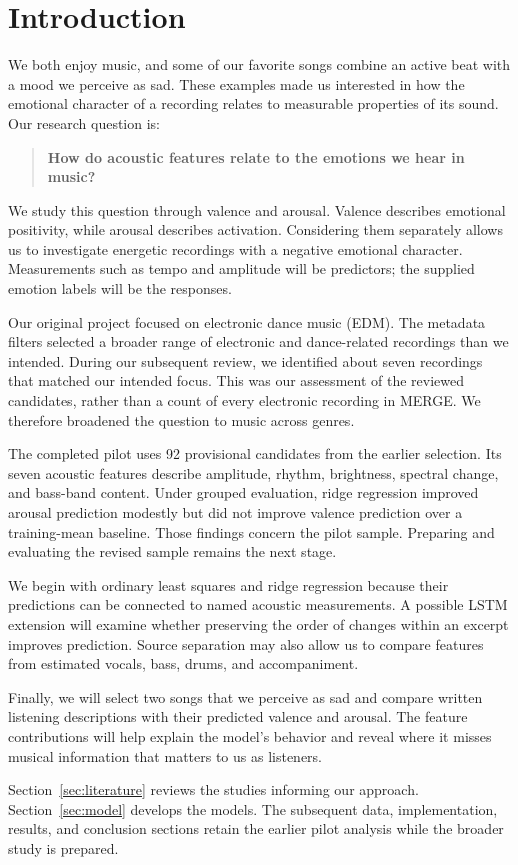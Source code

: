 \section{Introduction}
\label{sec:introduction}

We both enjoy music, and some of our favorite songs combine an active beat with a mood we perceive as sad. These examples made us interested in how the emotional character of a recording relates to measurable properties of its sound. Our research question is:
\begin{quote}
\textbf{How do acoustic features relate to the emotions we hear in music?}
\end{quote}

We study this question through valence and arousal. Valence describes emotional positivity, while arousal describes activation. Considering them separately allows us to investigate energetic recordings with a negative emotional character. Measurements such as tempo and amplitude will be predictors; the supplied emotion labels will be the responses.

Our original project focused on electronic dance music (EDM). The metadata filters selected a broader range of electronic and dance-related recordings than we intended. During our subsequent review, we identified about seven recordings that matched our intended focus. This was our assessment of the reviewed candidates, rather than a count of every electronic recording in MERGE. We therefore broadened the question to music across genres.

The completed pilot uses 92 provisional candidates from the earlier selection. Its seven acoustic features describe amplitude, rhythm, brightness, spectral change, and bass-band content. Under grouped evaluation, ridge regression improved arousal prediction modestly but did not improve valence prediction over a training-mean baseline. Those findings concern the pilot sample. Preparing and evaluating the revised sample remains the next stage.

We begin with ordinary least squares and ridge regression because their predictions can be connected to named acoustic measurements. A possible LSTM extension will examine whether preserving the order of changes within an excerpt improves prediction. Source separation may also allow us to compare features from estimated vocals, bass, drums, and accompaniment.

Finally, we will select two songs that we perceive as sad and compare written listening descriptions with their predicted valence and arousal. The feature contributions will help explain the model's behavior and reveal where it misses musical information that matters to us as listeners.

Section~\ref{sec:literature} reviews the studies informing our approach. Section~\ref{sec:model} develops the models. The subsequent data, implementation, results, and conclusion sections retain the earlier pilot analysis while the broader study is prepared.


